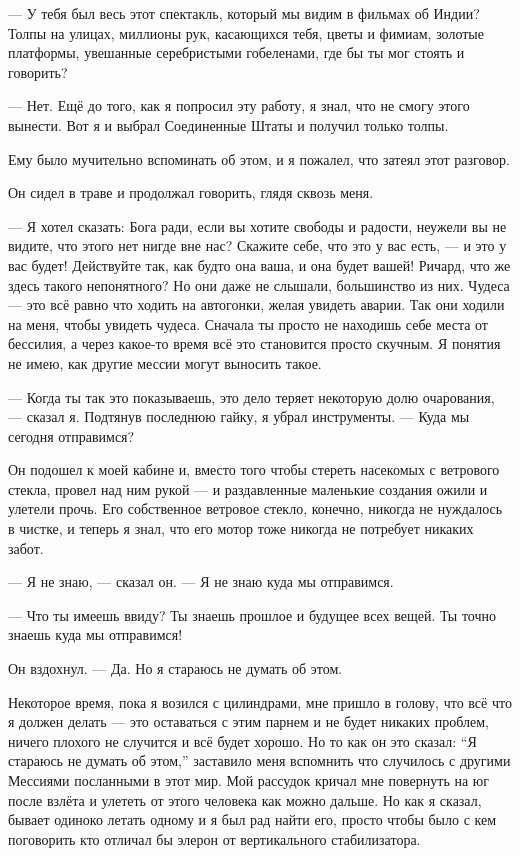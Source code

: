 --- У тебя был весь этот спектакль, который мы видим в фильмах об Индии? Толпы на улицах, миллионы рук, касающихся тебя, цветы и фимиам, золотые платформы, увешанные серебристыми гобеленами, где бы ты мог стоять и говорить?

--- Нет. Ещё до того, как я попросил эту работу, я знал, что не смогу этого вынести. Вот я и выбрал Соединенные Штаты и получил только толпы.

Ему было мучительно вспоминать об этом, и я пожалел, что затеял этот разговор.

Он сидел в траве и продолжал говорить, глядя сквозь меня.

--- Я хотел сказать: Бога ради, если вы хотите свободы и радости, неужели вы не видите, что этого
нет нигде вне нас? Скажите себе, что это у вас есть, --- и это у вас будет! Действуйте так, как
будто она ваша, и она будет вашей! Ричард, что же здесь такого непонятного? Но они даже не
слышали, большинство из них. Чудеса --- это всё равно что ходить на автогонки, желая увидеть
аварии. Так они ходили на меня, чтобы увидеть чудеса. Сначала ты просто не находишь себе места от
бессилия, а через какое-то время всё это становится просто скучным. Я понятия не имею, как другие
мессии могут выносить такое.

--- Когда ты так это показываешь, это дело теряет некоторую долю очарования, --- сказал я.
Подтянув последнюю гайку, я убрал инструменты. --- Куда мы сегодня отправимся?

Он подошел к моей кабине и, вместо того чтобы стереть насекомых с ветрового стекла, провел над
ним рукой --- и раздавленные маленькие создания ожили и улетели прочь. Его собственное ветровое
стекло, конечно, никогда не нуждалось в чистке, и теперь я знал, что его мотор тоже никогда не
потребует никаких забот.

--- Я не знаю, --- сказал он. --- Я не знаю куда мы отправимся.

--- Что ты имеешь ввиду? Ты знаешь прошлое и будущее всех вещей.
Ты точно знаешь куда мы отправимся!

Он вздохнул. --- Да. Но я стараюсь не думать об этом.

Некоторое время, пока я возился с цилиндрами, мне пришло в голову, что всё что я должен делать ---
это оставаться с этим парнем и не будет никаких проблем, ничего плохого не случится и всё
будет хорошо. Но то как он это сказал: ``Я стараюсь не думать об этом,'' заставило меня
вспомнить что случилось с другими Мессиями посланными в этот мир. Мой рассудок кричал мне
повернуть на юг после взлёта и улететь от этого человека как можно дальше. Но как я сказал,
бывает одиноко летать одному и я был рад найти его, просто чтобы было с кем поговорить кто
отличал бы элерон от вертикального стабилизатора.

